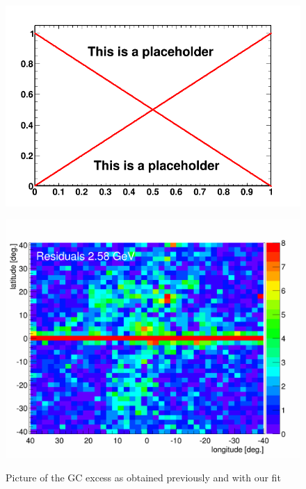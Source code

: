 \begin{figure}[h]
  \centering
  \begin{minipage}[h]{0.45\textwidth}
  	\centering
	\includegraphics[width=1.\linewidth]{pic/dummy.png}
  	\label{fig:original_GC_excess}
  \end{minipage}
  \hfill
  \begin{minipage}[h]{0.45\textwidth}
	  \centering
	  \includegraphics[width=1.\linewidth]{pic/results/BKGonly_halo_residuals.png}
	  \label{fig:our_GC_excess}
  \end{minipage}
  \caption{Picture of the GC excess as obtained previously and with our fit}
  \label{fig:GC_excess}	 
\end{figure}

